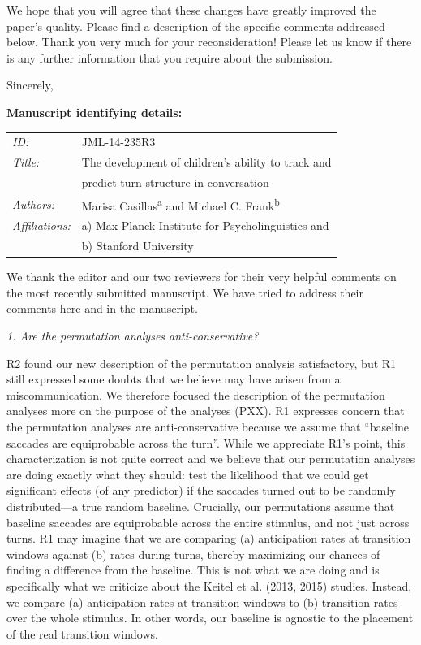 \documentclass[11pt,a4paper]{letter} %
\begin{document}
\begin{letter}{}
\noindent We hope that you will agree that these changes have greatly improved the paper's quality. Please find a description of the specific comments addressed below. Thank you very much for your reconsideration! Please let us know if there is any further information that you require about the submission.

\closing{Sincerely,}

\bigskip 
\bigskip 

\textbf{Manuscript identifying details:}

\begin{tabular}{ll}
\textit{ID:} & JML-14-235R3 \\
\textit{Title:} & The development of children's ability to track and \\
& predict turn structure in conversation \\
\textit{Authors:} & Marisa Casillas\textsuperscript{a} and Michael C. Frank\textsuperscript{b} \\
\textit{Affiliations:} & a) Max Planck Institute for Psycholinguistics and \\
& b) Stanford University
\end{tabular}

\newpage

\noindent We thank the editor and our two reviewers for their very helpful comments on the most recently submitted manuscript. We have tried to address their comments here and in the manuscript.

\medskip

\noindent \textit{1. Are the permutation analyses anti-conservative?}

\noindent R2 found our new description of the permutation analysis satisfactory, but R1 still expressed some doubts that we believe may have arisen from a miscommunication. We therefore focused the description of the permutation analyses more on the purpose of the analyses (PXX). R1 expresses concern that the permutation analyses are anti-conservative because we assume that ``baseline saccades are equiprobable across the turn''. While we appreciate R1's point, this characterization is not quite correct and we believe that our permutation analyses are doing exactly what they should: test the likelihood that we could get significant effects (of any predictor) if the saccades turned out to be randomly distributed---a true random baseline. Crucially, our permutations assume that baseline saccades are equiprobable across the entire stimulus, and not just across turns. R1 may imagine that we are comparing (a) anticipation rates at transition windows against (b) rates during turns, thereby maximizing our chances of finding a difference from the baseline. This is not what we are doing and is specifically what we criticize about the Keitel et al. (2013, 2015) studies. Instead, we compare (a) anticipation rates at transition windows to (b) transition rates over the whole stimulus. In other words, our baseline is agnostic to the placement of the real transition windows.


\end{letter}
\end{document}
